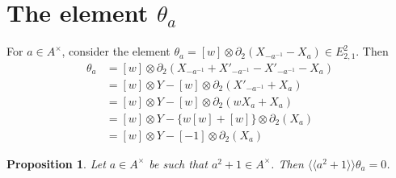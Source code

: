 \documentclass[11pt]{amsart}
\theoremstyle{definition}
\theoremstyle{plain}
\newtheorem{prp}[ntn]{Proposition}
\numberwithin{equation}{section}
\renewcommand{\aa}{{A^\times}}
\newcommand{\Lan}{\langle \! \langle}
\newcommand{\Ran}{\rangle \! \rangle}
\begin{document}
\section{The element \texorpdfstring{$\theta_a$}{Oa}}
For $a\in\aa$, consider the element $\theta_a=[w]\otimes\partial_2(X_{-a^{-1}}-X_a)\in E^2_{2,1}$. Then
\begin{equation}
    \label{tht-id}
    \begin{split}
    \theta_a&=[w]\otimes\partial_2(X_{-a^{-1}}+X'_{-a^{-1}}-X'_{-a^{-1}}-X_a)\\
    &=[w]\otimes Y - [w]\otimes\partial_2(X'_{-a^{-1}}+X_a)\\
    &=[w]\otimes Y - [w]\otimes\partial_2(wX_a+X_a)\\
    &=[w]\otimes Y - \{w[w]+[w]\}\otimes\partial_2(X_a)\\
    &=[w]\otimes Y - [-1]\otimes\partial_2(X_a)
    \end{split}
\end{equation}
\begin{prp}
    \label{sqr-plus-tht}
    Let $a\in\aa$ be such that $a^2+1\in\aa$. Then $\Lan a^2+1\Ran\theta_a=0$.
\end{prp}
\end{document}
